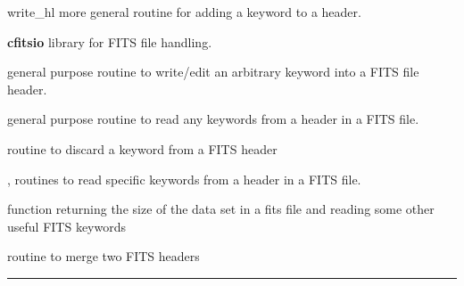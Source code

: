 \begin{modules}
  \begin{sulist}{} %
  \item[write\_hl] more general routine for adding a keyword to a header.
  \item[\textbf{cfitsio}] library for FITS file handling.		
  \end{sulist}
\end{modules}

\begin{related}
  \begin{sulist}{} %
  \item[\htmlref{add\_card}{sub:add_card}] general purpose routine to write/edit an arbitrary
keyword into a FITS file header.
  \item[\htmlref{get\_card}{sub:get_card}] general purpose routine to read any keywords from a header in a FITS file.
  \item[\htmlref{del\_card}{sub:del_card}] routine to discard a keyword from a FITS header
  \item[\htmlref{read\_par}{sub:read_par}, \htmlref{number\_of\_alms}{sub:number_of_alms}] routines to read specific keywords from a
  header in a FITS file.
  \item[\htmlref{getsize\_fits}{sub:getsize_fits}] function returning the size of the data set in a fits
  file and reading some other useful FITS keywords
  \item[\htmlref{merge\_headers}{sub:merge_headers}] routine to merge two FITS headers
  \end{sulist}
\end{related}

\rule{\hsize}{2mm}

\newpage
